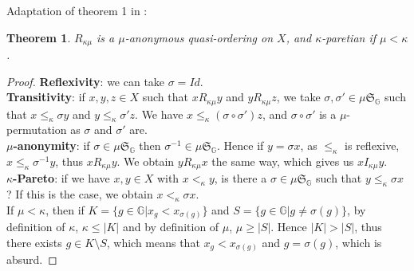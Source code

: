 \documentclass{article}
\newcommand{\G}{\mathbb{G}}
\newtheorem{theorem}{Theorem}
\begin{document}
Adaptation of theorem 1 in \cite{svensson80}:
\begin{theorem}
    $R_{\kappa\mu}$ is a $\mu$-anonymous quasi-ordering on $X$, and $\kappa$-paretian if
    $\mu < \kappa$. %
\end{theorem}
\begin{proof}
    \textbf{Reflexivity}: we can take $\sigma = Id$.\\
    \textbf{Transitivity}: if $x,y,z\in X$ such that $x R_{\kappa\mu} y$ and $y R_{\kappa\mu} z$,
    we take $\sigma,\sigma'\in \mu\mathfrak{S}_\G$ such that $x\leq_\kappa \sigma y$ and
    $y\leq_\kappa \sigma' z$. We have $x\leq_\kappa (\sigma\circ\sigma')z$,
    and $\sigma\circ\sigma'$ is a $\mu$-permutation as $\sigma$ and $\sigma'$ are.\\
    \textbf{$\mu$-anonymity}: if $\sigma\in\mu\mathfrak{S}_\G$
    then $\sigma^{-1}\in\mu\mathfrak{S}_\G$. Hence if $y=\sigma x$, as $\leq_\kappa$ is reflexive,
    $x\leq_\kappa\sigma^{-1}y$, thus $x R_{\kappa\mu} y$. We obtain $y R_{\kappa\mu} x$ the same
    way, which gives us $x I_{\kappa\mu} y$.\\
    \textbf{$\kappa$-Pareto}: if we have $x,y\in X$ with $x<_\kappa y$, is there a
    $\sigma\in \mu\mathfrak{S}_\G$ such that $y\leq_\kappa \sigma x$? If this is the case,
    we obtain $x<_\kappa \sigma x$.\\
    If $\mu < \kappa$, then if $K=\{g\in\G|x_g<x_{\sigma(g)}\}$ and
    $S = \{g\in\G|g \neq\sigma(g)\}$,
    by definition of $\kappa$, $\kappa\leq|K|$ and by definition of $\mu$, $\mu\geq |S|$.
    Hence $|K|>|S|$, thus there exists $g\in K\setminus S$, which means that
    $x_g<x_{\sigma(g)}$ and $g=\sigma(g)$, which is absurd.
\end{proof}



\end{document}
